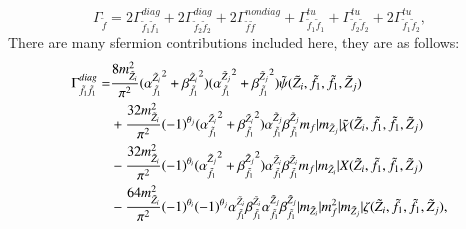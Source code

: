 \documentclass[final,3p,times]{elsarticle}
\begin{document}
\begin{equation}
\Gamma_{\tilde{f}} = 2\Gamma_{\tilde{f}_1 \tilde{f}_1}^{diag} + 2\Gamma_{\tilde{f}_2 \tilde{f}_2}^{diag} + 2\Gamma_{\tilde{f}\tilde{f}}^{nondiag} + \Gamma_{\tilde{f}_1 \tilde{f}_1}^{tu} + \Gamma_{\tilde{f}_2 \tilde{f}_2}^{tu} + 2\Gamma_{\tilde{f}_1 \tilde{f}_2}^{tu},
\end{equation}
There are many sfermion contributions included here, they are as follows:
\begin{equation}
\begin{aligned}
\Gamma_{\tilde{f}_1 \tilde{f}_1}^{diag} = & {8m_{\tilde{Z}_i}^2 \over \pi^2}({\alpha_{\tilde{f}_1}^{\tilde{Z}_i}}^2 + {\beta_{\tilde{f}_1}^{\tilde{Z}_i}}^2) ({\alpha_{\tilde{f}_1}^{\tilde{Z}_j}}^2 + {\beta_{\tilde{f}_1}^{\tilde{Z}_j}}^2)  \tilde{\psi}(\tilde{Z}_i,\tilde{f}_1,\tilde{f}_1,\tilde{Z}_j) \\ & + {32 m_{\tilde{Z}_i}^2 \over \pi^2}(-1)^{\theta_j} ({\alpha_{\tilde{f}_1}^{\tilde{Z}_i}}^2 + {\beta_{\tilde{f}_1}^{\tilde{Z}_i}}^2) {\alpha_{\tilde{f}_1}^{\tilde{Z}_j}} {\beta_{\tilde{f}_1}^{\tilde{Z}_j}} m_{f} |m_{\tilde{Z}_j}|\tilde{\chi}(\tilde{Z}_i,\tilde{f}_1, \tilde{f}_1, \tilde{Z}_j) \\ & - {32 m_{\tilde{Z}_i}^2 \over \pi^2} (-1)^{\theta_i} ({\alpha_{\tilde{f}_1}^{\tilde{Z}_j}}^2 + {\beta_{\tilde{f}_1}^{\tilde{Z}_j}}^2) {\alpha_{\tilde{f}_1}^{\tilde{Z}_i}} {\beta_{\tilde{f}_1}^{\tilde{Z}_i}} m_f |m_{\tilde{Z}_i}|X(\tilde{Z}_i, \tilde{f}_1, \tilde{f}_1, \tilde{Z}_j) \\ & - {64 m_{\tilde{Z}_i}^2 \over \pi^2}(-1)^{\theta_i}(-1)^{\theta_j} {\alpha_{\tilde{f}_1}^{\tilde{Z}_i}} {\beta_{\tilde{f}_1}^{\tilde{Z}_i}} {\alpha_{\tilde{f}_1}^{\tilde{Z}_j}} {\beta_{\tilde{f}_1}^{\tilde{Z}_j}} |m_{\tilde{Z}_i}|m_{f}^2 |m_{\tilde{Z}_j}| \zeta(\tilde{Z}_{i},\tilde{f}_{1}, \tilde{f}_1, \tilde{Z}_j),
\end{aligned}
\end{equation}
\end{document}
